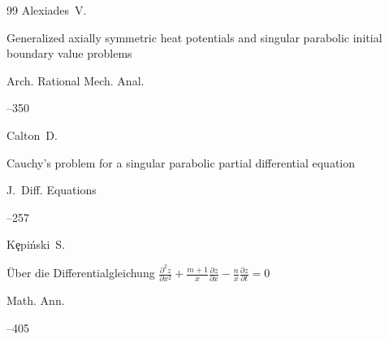 \begin{thebibliography}{99}
\by Alexiades~V.

\paper Generalized axially symmetric heat potentials and singular parabolic initial boundary value problems

\jour Arch. Rational Mech. Anal.




--350










\by Calton~D.

\paper Cauchy's problem for a singular parabolic partial differential equation

\jour J.~Diff. Equations




--257









\by K\c{e}pi\'nski~S.

\paper \"Uber die Differentialgleichung $\frac{\partial^2 z }{\partial x^2}+\frac{m+1}{x}\frac{\partial z }{\partial x} -\frac{n}{x}\frac{\partial z }{\partial t}=0$

\jour Math. Ann.




--405


\end{thebibliography}
